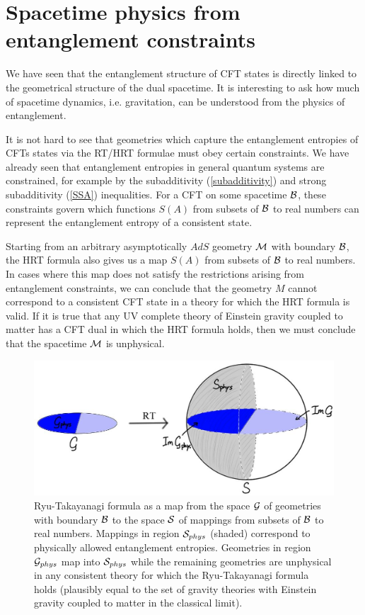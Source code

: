 \documentclass[12pt,epsf]{article}
\begin{document}
\section{Spacetime physics from entanglement constraints}

We have seen that the entanglement structure of CFT states is directly linked to the geometrical structure of the dual spacetime. It is interesting to ask how much of spacetime dynamics, i.e.  gravitation, can be understood from the physics of entanglement.

It is not hard to see that geometries which capture the entanglement entropies of CFTs states via the RT/HRT formulae must obey certain constraints. We have already seen that entanglement entropies in general quantum systems are constrained, for example by the subadditivity (\ref{subadditivity}) and strong subadditivity (\ref{SSA}) inequalities. For a CFT on some spacetime ${\cal B}$, these constraints govern which functions $S(A)$ from subsets of ${\cal B}$ to real numbers can represent the entanglement entropy of a consistent state.

Starting from an arbitrary asymptotically $AdS$ geometry ${\cal M}$ with boundary ${\cal B}$, the HRT formula also gives us a map $S(A)$ from subsets of ${\cal B}$ to real numbers. In cases where this map does not satisfy the restrictions arising from entanglement constraints, we can conclude that the geometry $M$ cannot correspond to a consistent CFT state in a theory for which the HRT formula is valid. If it is true that any UV complete theory of Einstein gravity coupled to matter has a CFT dual in which the HRT formula holds, then we must conclude that the spacetime ${\cal M}$ is unphysical.

\begin{figure}
\centering
\includegraphics[width=\textwidth]{intropic2.eps}
\caption{Ryu-Takayanagi formula as a map from the space ${\bf \cal G}$ of geometries with boundary ${\cal B}$ to the space ${\bf \cal S}$ of mappings from subsets of ${\cal B}$ to real numbers. Mappings in region  ${\bf \cal S}_{phys}$ (shaded) correspond to physically allowed entanglement entropies. Geometries in region ${\bf \cal G}_{phys}$ map into ${\bf \cal S}_{phys}$ while the remaining geometries are unphysical in any consistent theory for which the Ryu-Takayanagi formula holds (plausibly equal to the set of gravity theories with Einstein gravity coupled to matter in the classical limit).}
\label{intropic}
\end{figure}
\end{document}
